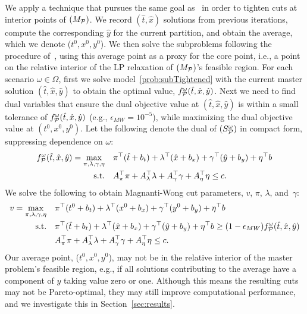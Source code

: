 \documentclass[11pt]{article}
\newcommand{\noi}{\noindent}
\newcommand{\cP}{{\cal P}}
\begin{document}
	We apply a technique that pursues the same goal as~\citeauthor{magnanti1981accelerating} in order to tighten cuts at interior points of \((M_\cP)\). We record \((\hat{t},\hat{x})\) solutions from previous iterations, compute the corresponding \(\hat{y}\) for the current partition, and obtain the average, which we denote (\(t^0,x^0,y^0\)). We then solve the subproblems following the procedure of~\citet{magnanti1981accelerating}, using this average point as a proxy for the core point, i.e., a point on the relative interior of the LP relaxation of \((M_{\cP})\)'s feasible region. For each scenario \(\omega \in \Omega\), first we solve model~\eqref{prob:subTightened} with the current master solution  \((\hat{t},\hat{x},\hat{y})\) to obtain the optimal value, \(f^{\omega}_{\cP}(\hat{t},\hat{x},\hat{y})\). Next we need to find dual variables that ensure the dual objective value at \((\hat{t},\hat{x},\hat{y})\) is within a small tolerance of \(f^{\omega}_{\cP}(\hat{t},\hat{x},\hat{y})\) (e.g., \(\epsilon_{MW} = 10^{-5}\)), while maximizing the dual objective value at \((t^0,x^0,y^0)\). Let the following denote the dual of \((S^\omega_\cP)\) in compact form, suppressing dependence on $\omega$:
	\begin{subequations} \label{prob:subdual}
		\begin{align}
		f^{\omega}_{\cP}(\hat{t},\hat{x},\hat{y})=
		\max_{\pi,\lambda,\gamma,\eta} \quad & \pi^\top (\hat{t} + b_t) + \lambda^\top (\hat{x} + b_x) + \gamma^\top (\hat{y} + b_y) + \eta^\top b \\
		\text{s.t.} \quad & A^\top_{\pi} \pi + A^\top_{\lambda} \lambda + A^\top_{\gamma} \gamma + A^\top_{\eta} \eta \leq c.
		\end{align}
	\end{subequations}
	We solve the following to obtain Magnanti-Wong cut parameters, \({v}\), \(\pi\), \(\lambda\), and~\(\gamma\):
	\begin{subequations} \label{prob:subMW}
		\begin{align}
		{v} = \max_{\pi,\lambda,\gamma,\eta} \quad & \pi^\top (t^0 + b_t) + \lambda^\top (x^0 + b_x) + \gamma^\top (y^0 + b_y) + \eta^\top b  \\
		\text{s.t.} \quad & \pi^\top (\hat{t} + b_t) + \lambda^\top (\hat{x} + b_x) + \gamma^\top (\hat{y} + b_y) + \eta^\top b \geq (1 - \epsilon_{MW}) f^{\omega}_{\cP}(\hat{t},\hat{x},\hat{y}) \\
		& A^\top_{\pi} \pi + A^\top_{\lambda} \lambda + A^\top_{\gamma} \gamma + A^\top_{\eta} \eta \leq c.
		\end{align}
	\end{subequations}
	\noi Our average point, (\(t^0,x^0,y^0\)), may not be in the relative interior of the master problem's feasible region, e.g.,  if all solutions contributing to the average have a component of $y$ taking value zero or one. Although this means the resulting  cuts may not be Pareto-optimal, they may still  improve computational performance, 
	and we investigate this in Section~\ref{sec:results}.
	
\end{document}
